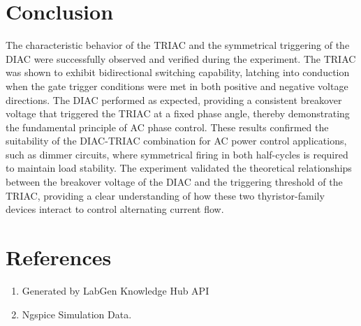 \documentclass[12pt,a4paper]{article}
\begin{document}
\section{Conclusion}
The characteristic behavior of the TRIAC and the symmetrical triggering of the DIAC were successfully observed and verified during the experiment. The TRIAC was shown to exhibit bidirectional switching capability, latching into conduction when the gate trigger conditions were met in both positive and negative voltage directions. The DIAC performed as expected, providing a consistent breakover voltage that triggered the TRIAC at a fixed phase angle, thereby demonstrating the fundamental principle of AC phase control. These results confirmed the suitability of the DIAC-TRIAC combination for AC power control applications, such as dimmer circuits, where symmetrical firing in both half-cycles is required to maintain load stability. The experiment validated the theoretical relationships between the breakover voltage of the DIAC and the triggering threshold of the TRIAC, providing a clear understanding of how these two thyristor-family devices interact to control alternating current flow.

\section{References}
\begin{enumerate}

    \item Generated by LabGen Knowledge Hub API

    \item Ngspice Simulation Data.

\end{enumerate}
\end{document}
